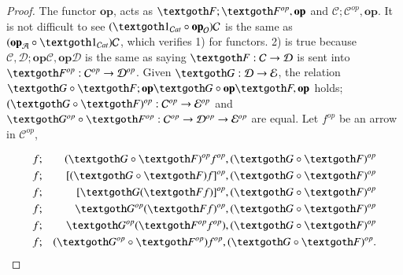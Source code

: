 \documentclass [12pt]{book}
\begin{document}
\begin{proof}The functor $\textbf{op}$, acts as $\textgoth F;\textgoth F^{op},\textbf{op}$ and $\mathcal C;\mathcal C^{op},\textbf{op}$. It is not difficult to see $(\textgoth1_{\mathcal Cat}\circ\textbf{op}_\mathcal O)\mathcal C$ is the same as $(\textbf{op}_\mathcal A\circ\textgoth1_{\mathcal Cat})\mathcal C$, which verifies 1) for functors. 2) is true because $\mathcal C,\mathcal D;\textbf{op}\mathcal C,\textbf{op}\mathcal D$ is the same as saying $\textgoth F:\mathcal C\rightarrow\mathcal D$ is sent into $\textgoth F^{op}:\mathcal C^{op}\rightarrow\mathcal D^{op}$. Given $\textgoth G:\mathcal D\rightarrow\mathcal E$, the relation $\textgoth G\circ\textgoth F;\textbf{op}\textgoth G\circ\textbf{op}\textgoth F,\textbf{op}$ holds; $(\textgoth G\circ\textgoth F)^{op}:\mathcal C^{op}\rightarrow\mathcal E^{op}$ and $\textgoth G^{op}\circ\textgoth F^{op}:\mathcal C^{op}\rightarrow\mathcal D^{op}\rightarrow\mathcal E^{op}$ are equal. Let $f^{op}$ be an arrow in $\mathcal C^{op}$,

\begin{eqnarray}\nonumber f&;&(\textgoth G\circ\textgoth F)^{op}f^{op},(\textgoth G\circ\textgoth F)^{op}\\\nonumber f&;&[(\textgoth G\circ\textgoth F)f]^{op},(\textgoth G\circ\textgoth F)^{op}\\\nonumber f&;&[\textgoth G(\textgoth Ff)]^{op},(\textgoth G\circ\textgoth F)^{op}\\\nonumber f&;&\textgoth G^{op}(\textgoth Ff)^{op},(\textgoth G\circ\textgoth F)^{op}\\\nonumber f&;&\textgoth G^{op}(\textgoth F^{op}f^{op}),(\textgoth G\circ\textgoth F)^{op}\\\nonumber f&;&(\textgoth G^{op}\circ\textgoth F^{op})f^{op},(\textgoth G\circ\textgoth F)^{op}.\end{eqnarray}\end{proof}
\end{document}

